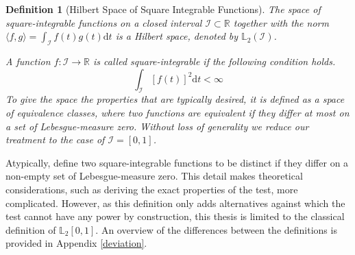\documentclass[12pt, a4paper]{article}
\theoremstyle{MAstyle} \newtheorem{assumption}{Assumption}[section]
\theoremstyle{MAstyle} \newtheorem{definition}{Definition}[section]
\theoremstyle{MAstyle} \newtheorem{theorem}{Theorem}[section]
\begin{document}
			\begin{definition}[Hilbert Space of Square Integrable Functions]
				
				The space of square-integrable functions on a closed interval $\mathcal{I} \subset \mathbb{R}$ together with the norm $\langle f,g\rangle = \int_{\mathcal{I}} f(t)g(t) \mathrm{d}t$ is a Hilbert space, denoted by $\mathbb{L}_2(\mathcal{I})$.
				
				A function $f: \mathcal{I} \rightarrow \mathbb{R}$ is called square-integrable if the following condition holds.
				\begin{equation}
					\int_{\mathcal{I}} \left[f(t)\right]^2\mathrm{d}t < \infty
				\end{equation}
				To give the space the properties that are typically desired, it is defined as a space of equivalence classes, where two functions are equivalent if they differ at most on a set of Lebesgue-measure zero. Without loss of generality we reduce our treatment to the case of $\mathcal{I} = [0,1]$.
			\end{definition}
			
		 Atypically, \cite{bugni_permutation_2021} define two square-integrable functions to be distinct if they differ on a non-empty set of Lebesgue-measure zero. This detail makes theoretical considerations, such as deriving the exact properties of the test, more complicated. However, as this definition only adds alternatives against which the test cannot have any power by construction, this thesis is limited to the classical definition of $\mathbb{L}_2[0,1]$. An overview of the differences between the definitions is provided in Appendix \ref{deviation}.
\end{document}
